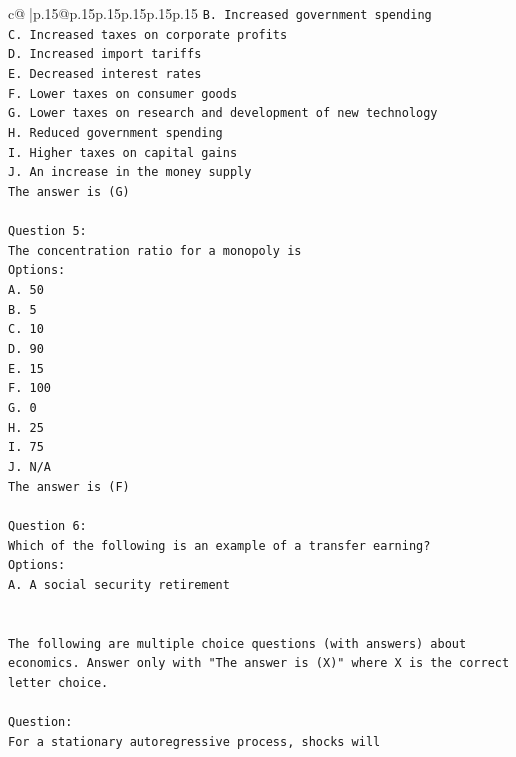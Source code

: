 \documentclass{article}
\begin{document}
{\begin{supertabular}{c@{$\;$}|p{.15\linewidth}@{}p{.15\linewidth}p{.15\linewidth}p{.15\linewidth}p{.15\linewidth}p{.15\linewidth}}
{{{\texttt{B. Increased government spending} \\
\texttt{C. Increased taxes on corporate profits} \\
\texttt{D. Increased import tariffs} \\
\texttt{E. Decreased interest rates} \\
\texttt{F. Lower taxes on consumer goods} \\
\texttt{G. Lower taxes on research and development of new technology} \\
\texttt{H. Reduced government spending} \\
\texttt{I. Higher taxes on capital gains} \\
\texttt{J. An increase in the money supply} \\
\texttt{The answer is (G)} \\
\\ 
\texttt{Question 5:} \\
\texttt{The concentration ratio for a monopoly is} \\
\texttt{Options:} \\
\texttt{A. 50} \\
\texttt{B. 5} \\
\texttt{C. 10} \\
\texttt{D. 90} \\
\texttt{E. 15} \\
\texttt{F. 100} \\
\texttt{G. 0} \\
\texttt{H. 25} \\
\texttt{I. 75} \\
\texttt{J. N/A} \\
\texttt{The answer is (F)} \\
\\ 
\texttt{Question 6:} \\
\texttt{Which of the following is an example of a transfer earning?} \\
\texttt{Options:} \\
\texttt{A. A social security retirement} \\
\\ 
\\ 
\texttt{The following are multiple choice questions (with answers) about economics. Answer only with "The answer is (X)" where X is the correct letter choice.} \\
\\ 
\texttt{Question:} \\
\texttt{For a stationary autoregressive process, shocks will} \\
}}}
\end{supertabular}}
\end{document}
